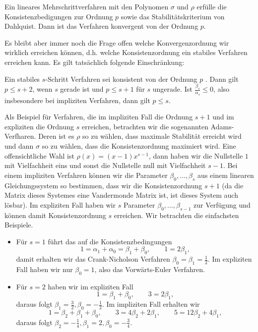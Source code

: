 \begin{theorem}{}{}
Ein lineares Mehrschrittverfahren mit den Polynomen $\sigma$ und $\rho$ erfülle die Konsistenzbedigungen zur Ordnung $p$ sowie das Stabilitätskriterium von Dahlquist. Dann ist das Verfahren konvergent von der Ordnung $p$.
\end{theorem}

Es bleibt aber immer noch die Frage offen welche Konvergenzordnung wir wirklich erreichen können, d.h. welche Konsistenzordnung ein stabiles Verfahren erreichen kann. Es gilt tatsächlich folgende Einschränkung:

\begin{theorem}{}{}
Ein stabiles $s$-Schritt Verfahren sei konsistent von der Ordnung $p$ . Dann gilt $p\leq s+2$, wenn $s$ gerade ist und $p \leq s+1$ für $s$ ungerade. Ist $\frac{\beta_s}{\alpha_s} \leq 0$, also insbesondere bei impliziten Verfahren, dann gilt $p\leq s$.
\end{theorem}

Als Beispiel für Verfahren, die im impliziten Fall die Ordnung $s+1$ und im expliziten die Ordnung $s$ erreichen, betrachten wir die sogenannten Adams-Verfharen. Deren ist es $\rho$ so zu wählen, dass maximale Stabilität erreicht wird und dann $\sigma$ so zu wählen, dass die Konsistenzordnung maximiert wird. Eine offensichtliche Wahl ist $\rho(x) = (x-1) x^{s-1}$, dann haben wir die Nullstelle $1$ mit Vielfachheit eins und sonst die Nullstelle null mit Vielfachheit $s-1$. Bei einem impliziten Verfahren können wir die Parameter $\beta_0,\ldots,\beta_s$ aus einem linearen Gleichungssystem so bestimmen, dass wir die Konsistenzordnung $s+1$ (da die Matrix dieses Systemes eine Vandermonde Matrix ist, ist dieses System auch lösbar). Im expliziten Fall haben wir $s$ Parameter $\beta_0, \ldots,\beta_{s-1}$ zur Verfügung und können damit Konsistenzordnung $s$ erreichen. Wir betrachten die einfachsten Beispiele.
%
\begin{itemize}
\item Für $s=1$ führt das auf die Konsistenzbedingungen
$$ 1 = \alpha_1 + \alpha_0 = \beta_1 + \beta_0, \qquad 1 = 2 \beta_1, $$
damit erhalten wir das Crank-Nicholson Verfahren $\beta_0 = \beta_1 = \frac{1}2$. Im expliziten Fall haben wir nur $\beta_0 =1$, also das Vorwärts-Euler Verfahren. 
%
\item Für $s=2$ haben wir im expliziten Fall
$$ 1 = \beta_1 + \beta_0, \qquad 3 = 2 \beta_1 , $$
daraus folgt $\beta_1 =  \frac{3}2, \beta_0 = -\frac{1}2$. Im impliziten Fall erhalten wir 
$$ 1 = \beta_2 + \beta_1 + \beta_0, \qquad 3 = 4 \beta_2 + 2 \beta_1, \qquad  5 = 12 \beta_2 + 4 \beta_1, $$
daraus folgt $\beta_2 = - \frac{1}4, \beta_1 = 2, \beta_0 = -\frac{3}4$.
\end{itemize}


